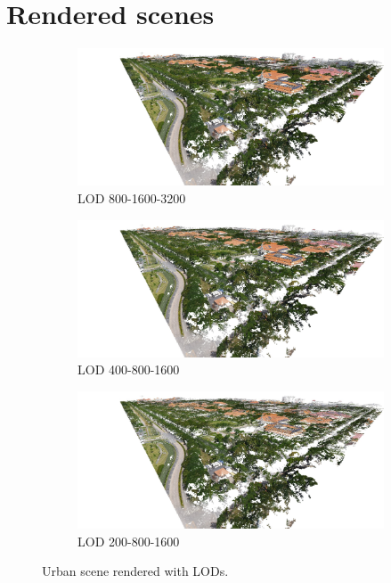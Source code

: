 \appendix

\chapter{Rendered scenes}
\label{appex:rendered-scenes}

\begin{figure}[h]
    \centering
    
    \begin{subfigure}{0.9\textwidth}
        \centering
        \includegraphics[width=\textwidth]{figs/results/lod-urban-800.jpg}
        \caption{LOD 800-1600-3200}
    \end{subfigure}
    
    \begin{subfigure}{0.9\textwidth}
        \centering
        \includegraphics[width=\textwidth]{figs/results/lod-urban-400.jpg}
        \caption{LOD 400-800-1600}
    \end{subfigure}
    
    \begin{subfigure}{0.9\textwidth}
        \centering
        \includegraphics[width=\textwidth]{figs/results/lod-urban-200.jpg}
        \caption{LOD 200-800-1600}
    \end{subfigure}
    
    \caption{Urban scene rendered with LODs.}
\end{figure}

